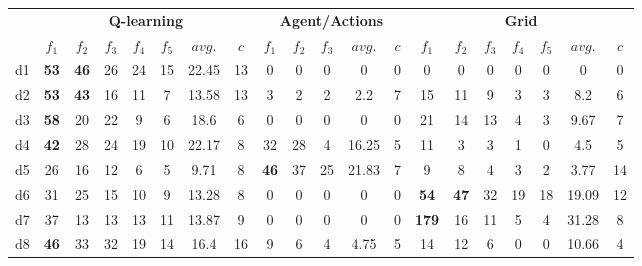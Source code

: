 \setlength{\tabcolsep}{3pt}
\begin{tabular*}{\linewidth}{ @{\extracolsep{\fill}}c | ccccccc | ccccc | ccccccc @{}}
\toprule
& \multicolumn{7}{c|}{\textbf{Q-learning}} & \multicolumn{5}{c|}{\textbf{Agent/Actions}} & \multicolumn{7}{c}{\textbf{Grid}} \\

& $f_1$ & $f_2$  & $f_3$  & $f_4$ & $f_5$ & $avg.$ & $c$ 
& $f_1$ & $f_2$  & $f_3$  & $avg.$ & $c$
& $f_1$ & $f_2$  & $f_3$  & $f_4$ & $f_5$ & $avg.$ & $c$  \\
\midrule

d1 &  \textbf{{\color{red}53}} & \textbf{{\color{red}46}}  &  26  &  24  &  15 &  22.45  &  13 
     & 0 & 0  &  0  &  0  &  0   
    &  0 & 0  &  0  &  0  &  0 &  0  &  0  \\

d2 &  \textbf{{\color{red}53}} & \textbf{{\color{red}43}}  &  16  &  11  &  7  &  13.58  &  13
     & 3  & 2  &  2  &  2.2  &  7 
    &  15 &  11 &   9  &  3 &  3 &  8.2  &  6  \\

d3 &  \textbf{{\color{red}58}} & 20  &  22  &  9  &  6 &  18.6  &  6 
     & 0 & 0  &  0  &  0  &  0   
    &  21 & 14  &  13  &  4  &  3 &  9.67  &  7  \\

d4 &  \textbf{{\color{red}42}} & 28  &  24  & 19  &  10 &  22.17  &  8 
     & 32 & 28  &  4  &  16.25  &  5   
    &  11 & 3  & 3  &  1  & 0 &  4.5  &  5  \\

d5 &  26 & 16  &  12  &  6  &  5 &  9.71  &  8
     & \textbf{{\color{red}46}} & 37  &  25  &  21.83  &  7   
    &  9 & 8  &  4  &  3  &  2 &  3.77  &  14  \\

d6 &  31 & 25  &  15  &  10  &  9 &  13.28  &  8 
     & 0 & 0  &  0  &  0  &  0   
    &  \textbf{{\color{red}54}} & \textbf{{\color{red}47}}  &  32  &  19  &  18 &  19.09  &  12  \\

d7 &  37 & 13  &  13  &  13  &  11 &  13.87  &  9 
     & 0 & 0  &  0  &  0  &  0   
    &  \textbf{{\color{red}179}} & 16  &  11  &  5  &  4 &  31.28  &  8  \\

d8 &  \textbf{{\color{red}46}} & 33  &  32  &  19  &  14 &  16.4  &  16 
     & 9 & 6  &  4  &  4.75  &  5   
    &  14 & 12  &  6  &  0  &  0 &  10.66  &  4  \\


\end{tabular*}
